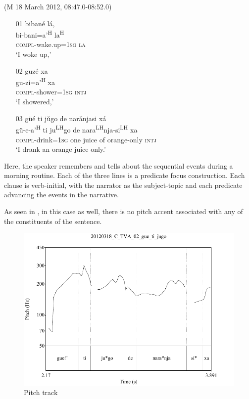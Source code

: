 \ea\label{guetijugo} (M 18 March 2012, 08:47.0-08:52.0)
\begin{itemize}
\item [01]
\glll biban\'{e} l\'{a}, \\
bi-bani=a'\textsuperscript{H} la\textsuperscript{H} \\
\textsc{compl}-wake.up=\textsc{1sg} \textsc{la} \\
\glt `I woke up,' 


\item [02]
\glll guz\'{e} xa \\
gu-zi=a'\textsuperscript{H} xa \\
\textsc{compl}-shower=\textsc{1sg} \textsc{intj} \\
\glt `I showered,' 


\item [03]
\glll g\"{u}\'{e} ti j\v{u}go de nar\v{a}njasi x\'{a} \\
g\"{u}-e-a'\textsuperscript{H} ti ju\textsuperscript{LH}go de nara\textsuperscript{LH}nja-si\textsuperscript{LH} xa \\
\textsc{compl}-drink=\textsc{1sg} one juice of orange-only \textsc{intj} \\
\glt `I drank an orange juice only.'

\end{itemize}
\z
Here, the speaker remembers and tells about the sequential events during a morning routine. Each of the three lines is a predicate focus construction. Each clause is verb-initial, with the narrator as the subject-topic and each predicate advancing the events in the narrative. 

As seen in , in this case as well, there is no pitch accent associated with any of the constituents of the sentence. 

\begin{figure} 
\caption{Pitch track}
\label{fig:5:guetijugo}
\includegraphics[height=.4\textheight]{guetijugo}
\end{figure}


